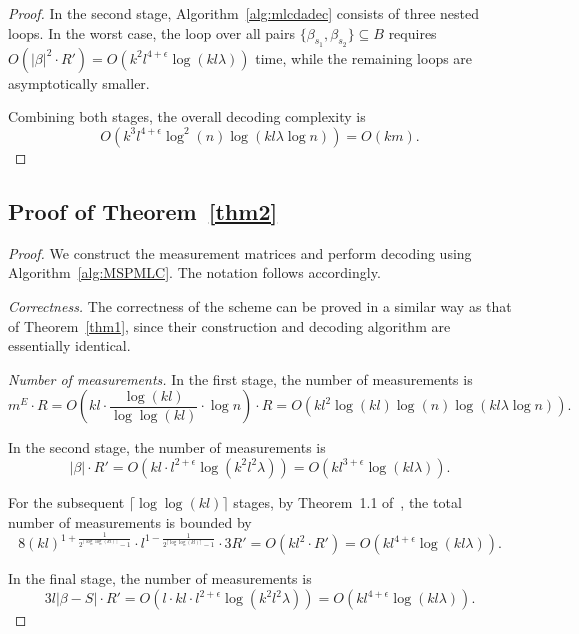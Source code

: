 \documentclass[10pt,a4paper]{amsart}
\begin{document}
\begin{proof}
In the second stage, Algorithm~\ref{alg:mlcdadec} consists of three nested loops. In the worst case, the loop over all pairs $\{\beta_{s_1}, \beta_{s_2}\} \subseteq B$ requires $O(|\beta|^2\cdot R') = O(k^2 l^{4+\epsilon}\log(kl\lambda))$ time, while the remaining loops are asymptotically smaller.

\medskip

Combining both stages, the overall decoding complexity is
\[
O\!\left(k^3 l^{4+\epsilon} \log^2 (n)\log(kl\lambda \log n)\right)=O(km).
\]
\end{proof}

\subsection{Proof of Theorem~\ref{thm2}}

\begin{proof}
    We construct the measurement matrices and perform decoding using Algorithm~\ref{alg:MSPMLC}. The notation follows accordingly.

\medskip

\emph{Correctness.}
The correctness of the scheme can be proved in a similar way as that of Theorem~\ref{thm1}, since their construction and decoding algorithm are essentially identical.

\medskip

\emph{Number of measurements.}
In the first stage, the number of measurements is
\[
m^E \cdot R
= O\!\left(kl \cdot \frac{\log(kl)}{\log\log(kl)} \cdot \log n\right) \cdot R
= O\!\left(kl^2 \log(kl)\log (n) \log(kl\lambda \log n)\right).
\]

In the second stage, the number of measurements is
\[
|\beta| \cdot R'
= O\!\left(kl \cdot l^{2+\epsilon} \log(k^2 l^2 \lambda)\right)
= O\!\left(kl^{3+\epsilon} \log(kl\lambda)\right).
\]

For the subsequent $\lceil \log\log(kl) \rceil$ stages, by Theorem~1.1 of~\cite{black2025learning}, the total number of measurements is bounded by
\[
8(kl)^{1+\frac{1}{2^{\lceil\log\log(kl)\rceil}-1}}
\cdot l^{1-\frac{1}{2^{\lceil\log\log(kl)\rceil}-1}}
\cdot 3R'
= O\!\left(kl^2 \cdot R'\right)
= O\!\left(kl^{4+\epsilon} \log(kl\lambda)\right).
\]

In the final stage, the number of measurements is
\[
3l|\beta - S| \cdot R'
= O\!\left(l \cdot kl \cdot l^{2+\epsilon} \log(k^2 l^2 \lambda)\right)
= O\!\left(kl^{4+\epsilon} \log(kl\lambda)\right).
\]

\medskip


\end{proof}
\end{document}
